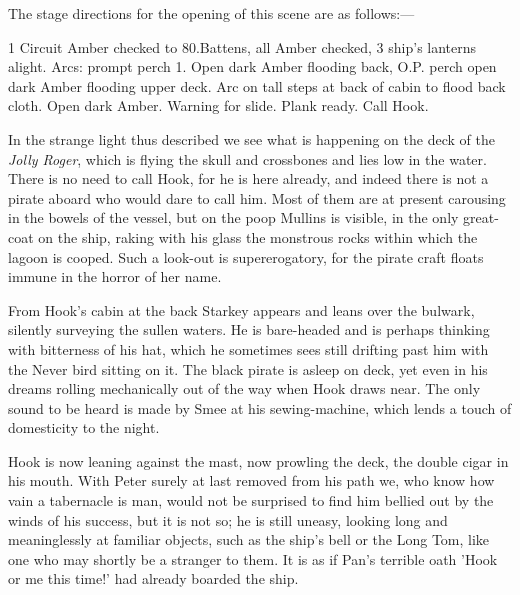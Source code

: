 
\act


\begin{stagedir}
The stage directions for the opening of this scene are as follows:—

1 Circuit Amber checked to 80.\@ Battens, all Amber checked,
3 ship's lanterns alight.
Arcs: prompt perch 1.
Open dark Amber flooding back, O.P.
perch open dark Amber flooding upper deck.
Arc on tall steps at back of cabin to flood back cloth.
Open dark Amber.
Warning for slide.
Plank ready.
Call Hook.

In the strange light thus described we see what is happening on the deck of the \emph{Jolly Roger},
which is flying the skull and crossbones and lies low in the water.
There is no need to call Hook, for he is here already,
and indeed there is not a pirate aboard who would dare to call him.
Most of them are at present carousing in the bowels of the vessel,
but on the poop Mullins is visible, in the only great-coat on the ship,
raking with his glass the monstrous rocks within which the lagoon is cooped.
Such a look-out is supererogatory, for the pirate craft floats immune in the horror of her name.

From Hook's cabin at the back Starkey appears and leans over the bulwark,
silently surveying the sullen waters.
He is bare-headed and is perhaps thinking with bitterness of his hat,
which he sometimes sees still drifting past him with the Never bird sitting on it.
The black pirate is asleep on deck,
yet even in his dreams rolling mechanically out of the way when Hook draws near.
The only sound to be heard is made by Smee at his sewing-machine,
which lends a touch of domesticity to the night.

Hook is now leaning against the mast, now prowling the deck, the double cigar in his mouth.
With Peter surely at last removed from his path we, who know how vain a tabernacle is man,
would not be surprised to find him bellied out by the winds of his success, but it is not so;
he is still uneasy, looking long and meaninglessly at familiar objects, such as the ship's bell or the Long Tom,
like one who may shortly be a stranger to them.
It is as if Pan's terrible oath 'Hook or me this time!' had already boarded the ship.
\end{stagedir}

